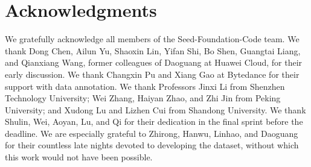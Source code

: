 \documentclass[11pt, a4paper, logo, copyright, nonumbering]{seed}
\begin{document}
\section*{Acknowledgments}
We gratefully acknowledge all members of the Seed-Foundation-Code team.
We thank Dong Chen, Ailun Yu, Shaoxin Lin, Yifan Shi, Bo Shen, Guangtai Liang, and Qianxiang Wang, former colleagues of Daoguang at Huawei Cloud, for their early discussion.
We thank Changxin Pu and Xiang Gao at Bytedance for their support with data annotation.
We thank Professors Jinxi Li from Shenzhen Technology University; Wei Zhang, Haiyan Zhao, and Zhi Jin from Peking University; and Xudong Lu and Lizhen Cui from Shandong University.
% 
We thank Shulin, Wei, Aoyan, Lu, and Qi for their dedication in the final sprint before the deadline.
We are especially grateful to Zhirong, Hanwu, Linhao, and Daoguang for their countless late nights devoted to developing the dataset, without which this work would not have been possible.

\newpage



\newpage

\appendix
\end{document}
